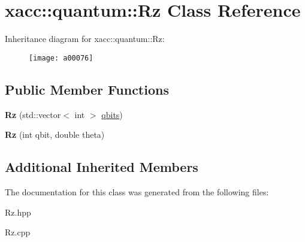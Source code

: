 \hypertarget{a00076}{}\section{xacc\+:\+:quantum\+:\+:Rz Class Reference}
\label{a00076}
Inheritance diagram for xacc\+:\+:quantum\+:\+:Rz\+:\begin{figure}[H]
\begin{center}
\leavevmode
\texttt{[image: a00076]}
\end{center}
\end{figure}
\subsection*{Public Member Functions}
\begin{DoxyCompactItemize}
\item 
{\bfseries Rz} (std\+::vector$<$ int $>$ \hyperlink{a00042_a2a56be6c2519ea65df4d06f4abae1393}{qbits})\hypertarget{a00076_a7ce912c7f9c9e8f4e7e60f9dba95538b}{}\label{a00076_a7ce912c7f9c9e8f4e7e60f9dba95538b}

\item 
{\bfseries Rz} (int qbit, double theta)\hypertarget{a00076_ae30eaf75feb8f896c22043629d21b834}{}\label{a00076_ae30eaf75feb8f896c22043629d21b834}

\end{DoxyCompactItemize}
\subsection*{Additional Inherited Members}


The documentation for this class was generated from the following files\+:\begin{DoxyCompactItemize}
\item 
Rz.\+hpp\item 
Rz.\+cpp\end{DoxyCompactItemize}
